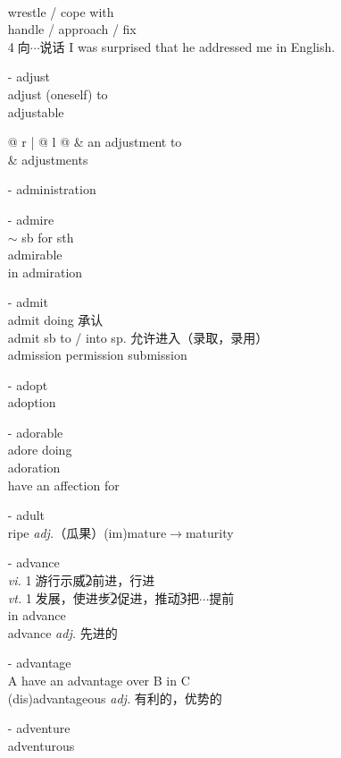 \documentclass[../../book.tex]{subfiles}
\begin{document}
\begin{multicols}{2}
\begin{itemize}
\\wrestle / cope with
\\handle / approach / fix
\\\textcircled{4}向$\cdots$说话 I was surprised that he addressed me in English.
\item[-] adjust
\\adjust (oneself) to
\\adjustable
\\\begin{tabular}{@{} r | @{\hspace{0.1em}} l @{}}
 & an adjustment to
\\& adjustments
\end{tabular}
\item[-] administration
\item[-] admire
\\$\sim$ sb for sth
\\admirable
\\in admiration
\item[-] admit
\\admit doing 承认
\\admit sb to / into sp. 允许进入（录取，录用）
\\admission {\color{violet}permission submission}
\item[-] adopt
\\adoption
\item[-] adorable
\\adore doing
\\adoration
\\have an affection for
\item[-] adult
\\ripe \emph{adj.}（瓜果）\phantom{a}(im)mature$\rightarrow$maturity
\item[-] advance
\\\emph{vi.} \textcircled{1}游行示威\textcircled{2}前进，行进
\\\emph{vt.} \textcircled{1}发展，使进步\textcircled{2}促进，推动\textcircled{3}把$\cdots$提前
\\in advance
\\advance \emph{adj.} 先进的
\item[-] advantage
\\A have an advantage over B in C
\\(dis)advantageous \emph{adj.} 有利的，优势的
\item[-] adventure
\\adventurous

\end{itemize}
\end{multicols}
\end{document}
